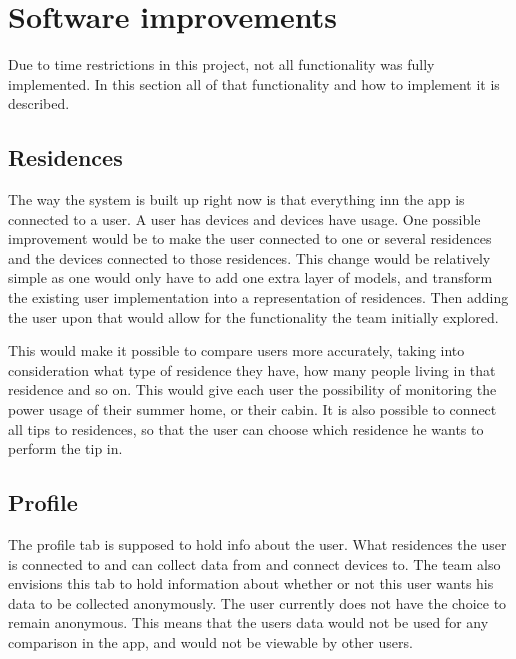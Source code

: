 \section{Software improvements}
Due to time restrictions in this project, not all functionality was fully implemented. In this section all of that functionality and how to implement it is described. 

\subsection{Residences}
The way the system is built up right now is that everything inn the app is connected to a user. A user has devices and devices have usage. One possible improvement would be to make the user connected to one or several residences and the devices connected to those residences. This change would be relatively simple as one would only have to add one extra layer of models, and transform the existing user implementation into a representation of residences. Then adding the user upon that would allow for the functionality the team initially explored.

This would make it possible to compare users more accurately, taking into consideration what type of residence they have, how many people living in that residence and so on. This would give each user the possibility of monitoring the power usage of their summer home, or their cabin. It is also possible to connect all tips to residences, so that the user can choose which residence he wants to perform the tip in. 

\subsection{Profile}

The profile tab is supposed to hold info about the user. What residences the user is connected to and can collect data from and connect devices to. The team also envisions this tab to hold information about whether or not this user wants his data to be collected anonymously. The user currently does not have the choice to remain anonymous. This means that the users data would not be used for any comparison in the app, and would not be viewable by other users.